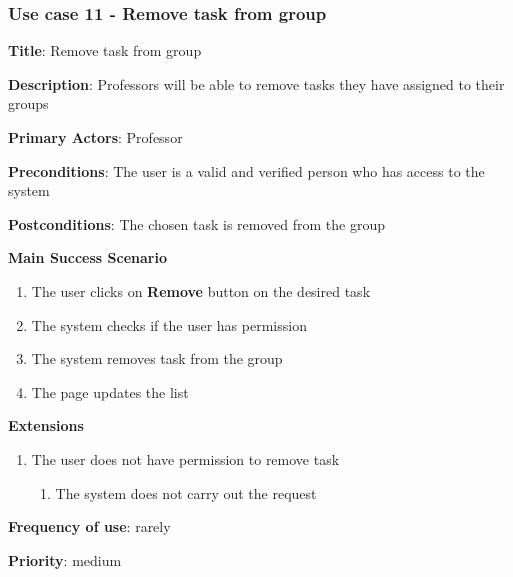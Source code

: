 \documentclass[singlespacing,12pt,parskip,headsepline,consistentlayout]{article}
\begin{document}
\subsubsection{Use case 11 - Remove task from group}
\begin{flushleft}
\vspace{0.2cm}
\hline
\vspace{0.2cm}
{\bfseries Title}: {Remove task from group}

{\bfseries Description}: {Professors will be able to remove tasks they have assigned to their groups}

{\bfseries Primary Actors}: {Professor}

{\bfseries Preconditions}: The user is a valid and verified person who has access to the system

{\bfseries Postconditions}: {The chosen task is removed from the group}

{\bfseries Main Success Scenario}

\begin{enumerate}
      \item The user clicks on {\bfseries Remove} button on the desired task
      \item The system checks if the user has permission
      \item The system removes task from the group
      \item The page updates the list
\end{enumerate}
 
{\bfseries Extensions}

\begin{enumerate}
  \item The user does not have permission to remove task
  \begin{enumerate}
      \item The system does not carry out the request
  \end{enumerate}
\end{enumerate}

{\bfseries Frequency of use}: rarely

{\bfseries Priority}: medium

\end{flushleft}

\pagebreak
\end{document}
